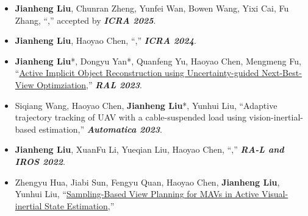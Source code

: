 %
%



\begin{itemize}
	\item \textbf{Jianheng Liu}, Chunran Zheng, Yunfei Wan, Bowen Wang, Yixi Cai, Fu Zhang, ``,''
	accepted by \textbf{\emph{ICRA 2025}}.\\
	\vspace{-8pt}
	\item \textbf{Jianheng Liu}, Haoyao Chen, ``,''
	\textbf{\emph{ICRA 2024}}.\\
	\vspace{-8pt}
	\item \textbf{Jianheng Liu}*, Dongyu Yan*, Quanfeng Yu, Haoyao Chen, Mengmeng Fu, ``\href{https://github.com/HITSZ-NRSL/ActiveImplicitRecon}{Active Implicit Object Reconstruction using Uncertainty-guided Next-Best-View Optimziation},''
	\textbf{\emph{RAL 2023}}.\\
	\vspace{-8pt}
	\item Siqiang Wang, Haoyao Chen, \textbf{Jianheng Liu}*, Yunhui Liu, ``Adaptive trajectory tracking of UAV with a cable-suspended load using vision-inertial-based estimation,''
	\textbf{\emph{Automatica 2023}}.\\
	\vspace{-8pt}
	\item \textbf{Jianheng Liu}, XuanFu Li, Yueqian Liu, Haoyao Chen, ``,''
	\textbf{\emph{RA-L and IROS 2022}}.\\
	\vspace{-8pt}
	\item Zhengyu Hua, Jiabi Sun, Fengyu Quan, Haoyao Chen, \textbf{Jianheng Liu}, Yunhui Liu, ``\href{https://ieeexplore.ieee.org/abstract/document/9981941/}{Sampling-Based View Planning for MAVs in Active Visual-inertial State Estimation},''

\end{itemize}
